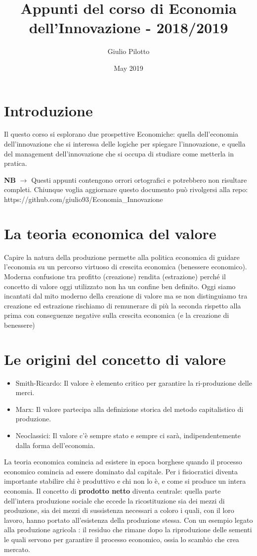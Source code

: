 \documentclass{article}
\title{Appunti del corso di Economia dell'Innovazione - 2018/2019}
\author{Giulio Pilotto}
\date{May 2019}
\begin{document}
\maketitle
\tableofcontents

\section{Introduzione}
Il questo corso si esplorano due prospettive Economiche: quella dell'economia dell'innovazione che si interessa delle logiche per spiegare l'innovazione, e quella del management dell'innovazione che si occupa di studiare come metterla in pratica.


\textbf{NB} $\rightarrow$ Questi appunti contengono orrori ortografici e potrebbero non risultare completi. Chiunque voglia aggiornare questo documento può rivolgersi alla repo: https://github.com/giulio93/Economia\_Innovazione

\section{La teoria economica del valore}
Capire la natura della produzione permette alla politica economica di guidare l’economia su un percorso virtuoso di crescita economica (benessere economico).
Moderna confusione tra profitto (creazione) rendita
(estrazione) perché il concetto di valore oggi utilizzato
non ha un confine ben definito.
Oggi siamo incantati dal mito moderno della creazione
di valore ma se non distinguiamo tra creazione ed
estrazione rischiamo di remunerare di più la seconda
rispetto alla prima con conseguenze negative sulla
crescita economica (e la creazione di benessere)

\section{Le origini del concetto di valore}
\begin{itemize}
    \item Smith-Ricardo: Il valore è elemento critico per garantire la ri-produzione delle merci.
    \item Marx: Il valore
        partecipa alla definizione storica del metodo capitalistico di
        produzione.
    \item Neoclassici:  Il
valore c’è sempre stato e sempre ci sarà, indipendentemente dalla
forma dell’economia. 
\end{itemize}

La teoria economica comincia ad esistere in epoca borghese quando
il processo economico comincia ad essere dominato dal capitale. 
Per i fisiocratici diventa importante stabilire chi è produttivo e chi non lo è, e come si produce un intera economia.
Il concetto di \textbf{prodotto netto} diventa centrale: quella parte dell’intera
produzione sociale che eccede la ricostituzione sia dei mezzi di produzione, sia
dei mezzi di sussistenza necessari a coloro i quali, con il loro lavoro, hanno
portato all’esistenza della produzione stessa.
Con un esempio legato alla produzione agricola : il residuo che rimane dopo la riproduzione delle sementi le quali servono per garantire il processo economico, ossia lo scambio che crea mercato.
\end{document}

